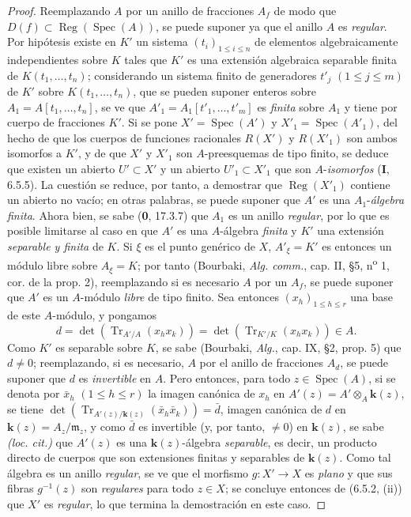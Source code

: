 \begin{proof}
Reemplazando $A$ por un anillo de fracciones $A_f$ de modo que
$D(f)\subset\operatorname{Reg}(\operatorname{Spec}(A))$, se puede suponer ya
que el anillo $A$ es \emph{regular}. Por hipótesis existe en $K'$ un sistema
$(t_i)_{1\leq i\leq n}$ de elementos algebraicamente independientes sobre
$K$ tales que $K'$ es una extensión algebraica separable finita de
$K(t_1,\ldots,t_n)$; considerando un sistema finito
de generadores $t'_j$ $(1\leq j\leq m)$ de $K'$ sobre
$K(t_1,\ldots,t_n)$, que se pueden suponer enteros sobre
$A_1=A[t_1,\ldots,t_n]$, se ve que
$A'_1=A_1[t'_1,\ldots,t'_m]$ es \emph{finita} sobre $A_1$ y tiene por cuerpo de
fracciones $K'$. Si se pone $X'=\operatorname{Spec}(A')$ y
$X'_1=\operatorname{Spec}(A'_1)$, del hecho de que los cuerpos de funciones
racionales $R(X')$ y $R(X'_1)$ son ambos isomorfos a $K'$, y de que $X'$
y $X'_1$ son $A$-preesquemas de tipo finito, se deduce que existen un
abierto $U'\subset X'$ y un abierto $U'_1\subset X'_1$ que son
$A$-\emph{isomorfos} (\textbf I, 6.5.5). La cuestión se reduce, por tanto, a demostrar que
$\operatorname{Reg}(X'_1)$ contiene un abierto no vacío; en otras palabras,
se puede suponer que $A'$ es una $A_1$-\emph{álgebra finita}. Ahora bien, se sabe
(\textbf 0, 17.3.7) que $A_1$ es un anillo \emph{regular}, por lo que es posible limitarse al
caso en que $A'$ es una $A$-álgebra \emph{finita} y $K'$ una extensión \emph{separable y
finita} de $K$. Si $\xi$ es el punto genérico de $X$, $A'_\xi=K'$ es
entonces un módulo libre sobre $A_\xi=K$; por tanto (Bourbaki,
\emph{Alg. comm.}, cap. II, \S5, n\textsuperscript{o} 1,
cor. de la prop. 2), reemplazando si es necesario $A$ por un $A_f$,
se puede suponer que $A'$ es un $A$-módulo \emph{libre} de tipo finito. Sea entonces
$(x_h)_{1\leq h\leq r}$ una base de este $A$-módulo, y pongamos
\[
d=\det(\operatorname{Tr}_{A'/A}(x_hx_k))=
\det(\operatorname{Tr}_{K'/K}(x_hx_k))\in A.
\]
Como $K'$ es separable sobre $K$, se sabe (Bourbaki, \emph{Alg.}, cap. IX, \S2,
prop. 5) que $d\neq0$; reemplazando, si es necesario, $A$ por el anillo de
fracciones $A_d$, se puede suponer que $d$ es \emph{invertible} en $A$. Pero entonces,
para todo $z\in\operatorname{Spec}(A)$, si se denota por $\bar x_h$
$(1\leq h\leq r)$ la imagen canónica de $x_h$ en
$A'(z)=A'\otimes_A \boldsymbol{k}(z)$, se tiene
$\det(\operatorname{Tr}_{A'(z)/\mathbf{k}(z)}(\bar x_h\bar x_k))=\bar d$, imagen
canónica de $d$ en $\boldsymbol{k}(z)=A_z/\mathfrak m_z$, y como $\bar d$ es invertible
(y, por tanto, $\neq0$) en $\boldsymbol{k}(z)$, se sabe \emph{(loc. cit.)} que $A'(z)$ es una
$\boldsymbol{k}(z)$-álgebra \emph{separable}, es decir, un producto directo de cuerpos que son
extensiones finitas y separables de $\boldsymbol{k}(z)$. Como tal álgebra es un anillo
\emph{regular}, se ve que el morfismo $g:X'\to X$ es \emph{plano} y que sus fibras
$g^{-1}(z)$ son \emph{regulares} para todo $z\in X$; se concluye entonces de
(6.5.2, (ii)) que $X'$ es \emph{regular}, lo que termina la demostración en este
caso.
\end{proof}
